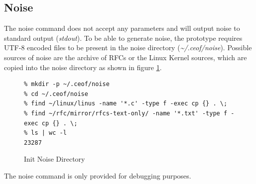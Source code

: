\subsection{Noise}
The noise command does not accept any parameters and will output noise to
standard output (\textit{stdout}).
To be able to generate noise, the prototype requires UTF-8 encoded
files to be present in the noise directory (\textit{\textasciitilde{}/.ceof/noise}).
Possible sources of noise are the archive of RFCs or
the Linux Kernel sources, which are copied
into the noise directory as shown in figure \ref{initnoise}.
\begin{figure}
\caption{Init Noise Directory}
\label{initnoise}
\begin{verbatim}
% mkdir -p ~/.ceof/noise
% cd ~/.ceof/noise 
% find ~/linux/linus -name '*.c' -type f -exec cp {} . \;
% find ~/rfc/mirror/rfcs-text-only/ -name '*.txt' -type f -exec cp {} . \;
% ls | wc -l
23287
\end{verbatim}
\end{figure}
The noise command is only provided for debugging purposes.

